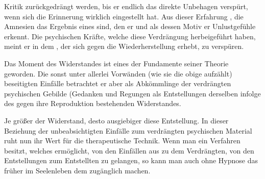 \documentclass[twoside=true,titlepage=false,open=any, parskip=never, fontsize=10pt, headings=small, chapterprefix=false, appendixprefix=false]{scrbook}
\begin{document}
               Kritik zurückgedrängt werden, bis er endlich das direkte Unbehagen verspürt,
               wenn sich die Erinnerung wirklich eingestellt hat. Aus dieser Erfahrung
               ,  die Amnesien das Ergebnis eines  sind, den er 
                und als dessen Motiv er Unlustgefühle erkennt. Die psychischen Kräfte,
               welche diese Verdrängung herbeigeführt haben, meint er in dem , der sich gegen die Wiederherstellung erhebt, zu
               verspüren.
        \pend
    


            
        \pstart
        Das Moment des Widerstandes ist eines der Fundamente seiner Theorie geworden.
               Die sonst unter allerlei Vorwänden (wie sie die obige  aufzählt) beseitigten Einfälle betrachtet er aber als Abkömmlinge der
               verdrängten psychischen Gebilde (Gedanken und Regungen als Entstellungen derselben infolge des gegen ihre Reproduktion
               bestehenden Widerstandes.
        \pend
    
            
        \pstart
        Je größer  der Widerstand, desto ausgiebiger diese Entstellung. In dieser Beziehung der unbeabsichtigten Einfälle zum
                  verdrängten psychischen Material ruht nun ihr Wert für die
                  therapeutische Technik. Wenn man ein Verfahren besitzt,
               welches ermöglicht, von den Einfällen aus zu dem Verdrängten, von den
               Entstellungen zum Entstellten zu gelangen, so kann man auch ohne Hypnose das
               früher  im Seelenleben dem
                zugänglich machen.
        \pend
    
\end{document}
